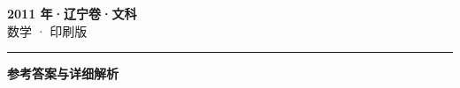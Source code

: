 \documentclass[zihao=5, a4paper]{ctexart}
\begin{document}
\begin{center}
  {\Large\bfseries 2011 年·辽宁卷·文科}\\[4pt]
  {\large 数学 · 印刷版}
\end{center}
\medskip
{}

\par\bigskip\hrule\bigskip
{}
\begin{center}{\large\bfseries 参考答案与详细解析}\end{center}
\smallskip

\end{document}
